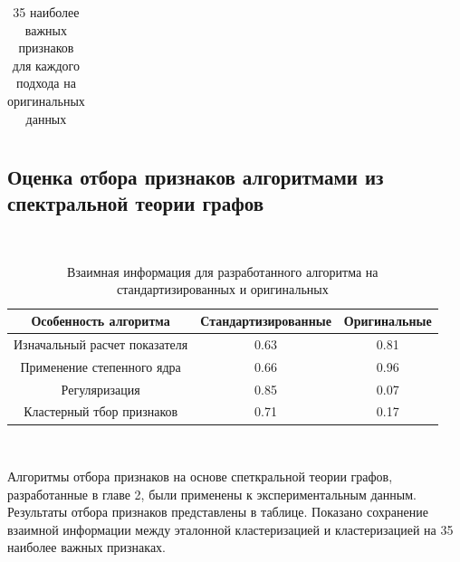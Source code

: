 \begin{longtable}{|c|c|c|c|}
\caption{35 наиболее важных признаков для каждого подхода на оригинальных данных}
\label{features_unnorm}
\end{longtable}

\subsection{Оценка отбора признаков алгоритмами из спектральной теории графов}

~

\begin{table}[H]
	\begin{tabular}{|c|c|c|}
	\hline
	Особенность алгоритма & Стандартизированные & Оригинальные \\ \hline
	Изначальный расчет показателя & 0.63 & 0.81 \\ \hline
	Применение степенного ядра & 0.66 & 0.96 \\ \hline
	Регуляризация & 0.85 & 0.07 \\ \hline
	Кластерный тбор признаков &  0.71 & 0.17 \\ \hline
	\end{tabular}
\caption{Взаимная информация для разработанного алгоритма на стандартизированных и оригинальных}
\end{table}

~

Алгоритмы отбора признаков на основе спеткральной теории графов, разработанные в главе 2, были применены к экспериментальным данным. Результаты отбора признаков представлены в таблице. Показано сохранение взаимной информации между эталонной кластеризацией и кластеризацией на 35 наиболее важных признаках. 


\newpage
